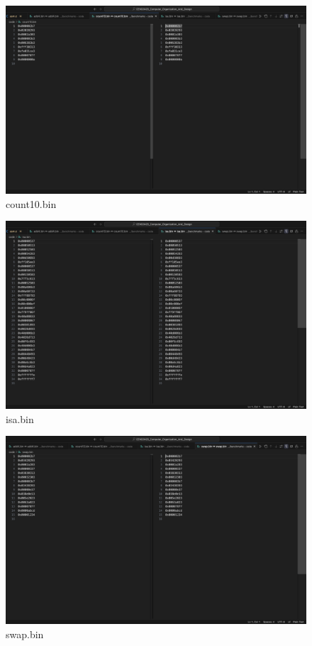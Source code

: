 \documentclass[12pt, a4paper]{article}
\begin{document}
\begin{figure}[H]
    \caption{count10.bin}
    \includegraphics[width=1\linewidth]{../figs/count10.png}
\end{figure}

\begin{figure}[H]
    \caption{isa.bin}
    \includegraphics[width=1\linewidth]{../figs/isa.png}
\end{figure}

\begin{figure}[H]
    \caption{swap.bin}
    \includegraphics[width=1\linewidth]{../figs/swap.png}
\end{figure}
\end{document}
